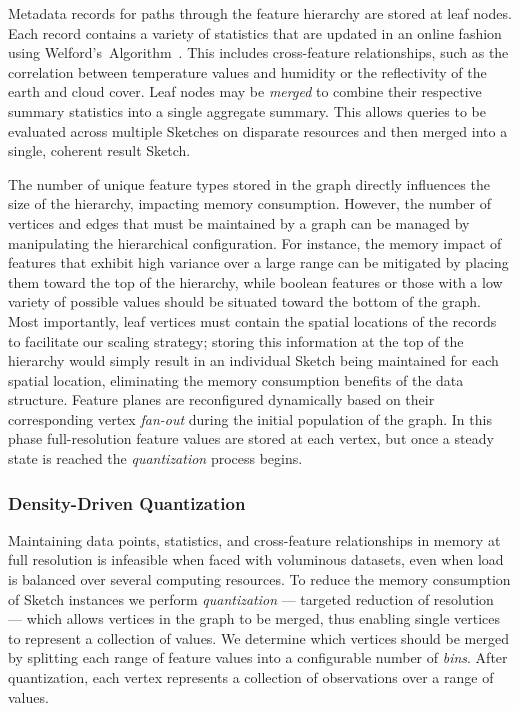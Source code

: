 Metadata records for paths through the feature hierarchy are stored at leaf nodes. Each record contains a variety of statistics that are updated in an online fashion using Welford's~Algorithm~\cite{welford1962note}. This includes cross-feature relationships, such as the correlation between temperature values and humidity or the reflectivity of the earth and cloud cover. Leaf nodes may be \emph{merged} to combine their respective summary statistics into a single aggregate summary. This allows queries to be evaluated across multiple Sketches on disparate resources and then merged into a single, coherent result Sketch.

The number of unique feature types stored in the graph directly influences the size of the hierarchy, impacting memory consumption. However, the number of vertices and edges that must be maintained by a graph can be managed by manipulating the hierarchical configuration. For instance, the memory impact of features that exhibit high variance over a large range can be mitigated by placing them toward the top of the hierarchy, while boolean features or those with a low variety of possible values should be situated toward the bottom of the graph. Most importantly, leaf vertices must contain the spatial locations of the records to facilitate our scaling strategy; storing this information at the top of the hierarchy would simply result in an individual Sketch being maintained for each spatial location, eliminating the memory consumption benefits of the data structure. Feature planes are reconfigured dynamically based on their corresponding vertex \emph{fan-out} during the initial population of the graph. In this phase full-resolution feature values are stored at each vertex, but once a steady state is reached the \emph{quantization} process begins.

\subsubsection{Density-Driven Quantization}
Maintaining data points, statistics, and cross-feature relationships in memory at full resolution is infeasible when faced with voluminous datasets, even when load is balanced over several computing resources. To reduce the memory consumption of Sketch instances we perform \emph{quantization} --- targeted reduction of resolution --- which allows vertices in the graph to be merged, thus enabling single vertices to represent a collection of values. We determine which vertices should be merged by splitting each range of feature values into a configurable number of \emph{bins}. After quantization, each vertex represents a collection of observations over a range of values.

